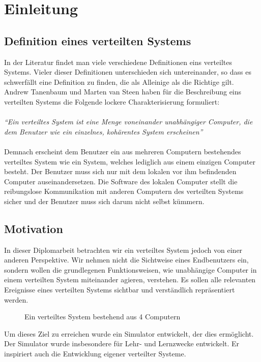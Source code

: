 \chapter{Einleitung}

\section{Definition eines verteilten Systems}

In der Literatur findet man viele verschiedene Definitionen eins verteiltes Systems. Vieler dieser Definitionen unterschieden sich untereinander, so dass es schwerf\"{a}llt eine Definition zu finden, die als Alleinige als die Richtige gilt. Andrew Tanenbaum und Marten van Steen haben f\"{u}r die Beschreibung eins verteilten Systems die Folgende lockere Charakterisierung formuliert:\\
\\
\cite{Tanenbaum} \textit{``Ein verteiltes System ist eine Menge voneinander unabh\"{a}ngiger Computer, die dem Benutzer wie ein einzelnes, koh\"{a}rentes System erscheinen''}\\
\\
Demnach erscheint dem Benutzer ein aus mehreren Computern bestehendes verteiltes System wie ein System, welches lediglich aus einem einzigen Computer besteht. Der Benutzer muss sich nur mit dem lokalen vor ihm befindenden Computer auseinandersetzen. Die Software des lokalen Computer stellt die reibungslose Kommunikation mit anderen Computern des verteilten Systems sicher und der Benutzer muss sich darum nicht selbst k\"{u}mmern.

\section{Motivation}

In dieser Diplomarbeit betrachten wir ein verteiltes System jedoch von einer anderen Perspektive. Wir nehmen nicht die Sichtweise eines Endbenutzers ein, sondern wollen die grundlegenen Funktionsweisen, wie unabh\"{a}ngige Computer in einem verteilten System miteinander agieren, verstehen. Es sollen alle relevanten Ereignisse eines verteilten Systems sichtbar und verst\"{a}ndlich repr\"{a}sentiert werden.

\begin{figure}[htbp]
	\centering
	\caption{Ein verteiltes System bestehend aus 4 Computern}
	\label{fig:VerteiltesSystem}
\end{figure}

Um dieses Ziel zu erreichen wurde ein Simulator entwickelt, der dies erm\"{o}glicht. Der Simulator wurde insbesondere f\"{u}r Lehr- und Lernzwecke entwickelt. Er inspiriert auch die Entwicklung eigener verteilter Systeme.

